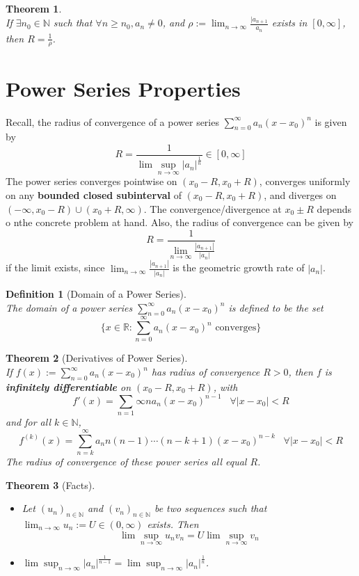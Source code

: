 \documentclass[12pt]{article}
\newtheorem{definition}{Definition}[section]
\newtheorem{theorem}{Theorem}[section]
\theoremstyle{definition}
\begin{document}
\begin{theorem}
\hfill\\\normalfont If $\exists n_0\in\mathbb{N}$ such that $\forall n\geq n_0, a_n\neq 0$, and $\rho:=\lim_{n\to\infty}\frac{|a_{n+1}}{a_n}$ exists in $[0,\infty]$, then $R=\frac{1}{\rho}$.
\end{theorem}
\clearpage
\section{Power Series Properties}
Recall, the radius of convergence of a power series $\sum_{n=0}^{\infty}a_n(x-x_0)^n$ is given by
\[
R=\frac{1}{\lim\sup_{n\to\infty}|a_n|^{\frac{1}{n}}}\in[0,\infty]
\]
The power series converges pointwise on $(x_0-R,x_0+R)$, converges uniformly on any \textbf{bounded closed subinterval} of $(x_0-R,x_0+R)$, and diverges on $(-\infty,x_0-R)\cup(x_0+R,\infty)$. The convergence/divergence at $x_0\pm R$ depends o nthe concrete problem at hand. Also, the radius of convergence can be given by
\[
R=\frac{1}{\lim_{n\to\infty}\frac{|a_{n+1}|}{|a_n|}}
\]
if the limit exists, since $\lim_{n\to\infty}\frac{|a_{n+1}|}{|a_n|}$ is the geometric growth rate of $|a_n|$.
\begin{definition}[Domain of a Power Series]
\hfill\\\normalfont The domain of a power series $\sum_{n=0}^\infty a_n(x-x_0)^n$ is defined to be the set 
\[
\{x\in\mathbb{R}:\sum_{n=0}^\infty a_n(x-x_0)^n \text{ converges}\}
\]
\end{definition}
\begin{theorem}[Derivatives of Power Series]
\hfill\\\normalfont If $f(x):=\sum_{n=0}^\infty a_n(x-x_0)^n$ has radius of convergence $R>0$, then $f$ is \textbf{infinitely differentiable} on $(x_0-R,x_0+R)$, with
\[
f'(x)=\sum_{n=1}\infty na_n(x-x_0)^{n-1}\;\;\;\forall |x-x_0|<R
\]
and for all $k\in\mathbb{N}$, 
\[
f^{(k)}(x)=\sum_{n=k}^\infty a_nn(n-1)\cdots(n-k+1)(x-x_0)^{n-k}\;\;\;\forall|x-x_0|<R
\]
The radius of convergence of these power series all equal $R$.
\end{theorem}
\begin{theorem}[Facts]
\begin{itemize}
	\item Let $(u_n)_{n\in\mathbb{N}}$ and $(v_n)_{n\in\mathbb{N}}$ be two sequences such that $\lim_{n\to\infty} u_n:=U\in(0,\infty)$ exists. Then
	\[
\lim\sup_{n\to\infty} u_nv_n=U\lim\sup_{n\to\infty} v_n
	\]
	\item $\lim\sup_{n\to\infty}|a_n|^{\frac{1}{n-1}}=\lim\sup_{n\to\infty}|a_n|^{\frac{1}{n}}$.
\end{itemize}
\end{theorem}
\clearpage
\end{document}
